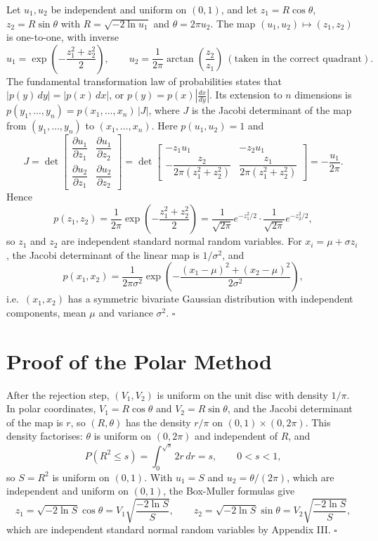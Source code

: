 \documentclass[12pt,a4paper]{article}
\begin{document}
{Let $u_1, u_2$ be independent and uniform on $(0,1)$, and let $z_1 = R\cos\theta$, $z_2 = R\sin\theta$ with $R = \sqrt{-2\ln u_1}$ and $\theta = 2\pi u_2$. The map $(u_1, u_2) \mapsto (z_1, z_2)$ is one-to-one, with inverse
\[
u_1 = \exp\left(-\frac{z_1^2 + z_2^2}{2}\right), \qquad u_2 = \frac{1}{2\pi}\arctan\left(\frac{z_2}{z_1}\right) \ (\text{taken in the correct quadrant}).
\]
The fundamental transformation law of probabilities states that $|p(y)\,dy| = |p(x)\,dx|$, or $p(y) = p(x)\left|\frac{dx}{dy}\right|$. Its extension to $n$ dimensions is $p(y_1, \dots, y_n) = p(x_1, \dots, x_n)\,|J|$, where $J$ is the Jacobi determinant of the map from $(y_1, \dots, y_n)$ to $(x_1, \dots, x_n)$. Here $p(u_1, u_2) = 1$ and
\[
J = \det\begin{bmatrix} \dfrac{\partial u_1}{\partial z_1} & \dfrac{\partial u_1}{\partial z_2} \\[8pt] \dfrac{\partial u_2}{\partial z_1} & \dfrac{\partial u_2}{\partial z_2}\end{bmatrix}
= \det\begin{bmatrix} -z_1 u_1 & -z_2 u_1 \\[4pt] -\dfrac{z_2}{2\pi(z_1^2 + z_2^2)} & \dfrac{z_1}{2\pi(z_1^2 + z_2^2)}\end{bmatrix}
= -\frac{u_1}{2\pi}.
\]
Hence
\[
p(z_1, z_2) = \frac{1}{2\pi}\exp\left(-\frac{z_1^2 + z_2^2}{2}\right) = \frac{1}{\sqrt{2\pi}}e^{-z_1^2/2} \cdot \frac{1}{\sqrt{2\pi}}e^{-z_2^2/2},
\]
so $z_1$ and $z_2$ are independent standard normal random variables. For $x_i = \mu + \sigma z_i$, the Jacobi determinant of the linear map is $1/\sigma^2$, and
\[
p(x_1, x_2) = \frac{1}{2\pi\sigma^2}\exp\left(-\frac{(x_1-\mu)^2 + (x_2-\mu)^2}{2\sigma^2}\right),
\]
i.e.\ $(x_1, x_2)$ has a symmetric bivariate Gaussian distribution with independent components, mean $\mu$ and variance $\sigma^2$. \hfill$\square$

\section{Proof of the Polar Method}

After the rejection step, $(V_1, V_2)$ is uniform on the unit disc with density $1/\pi$. In polar coordinates, $V_1 = R\cos\theta$ and $V_2 = R\sin\theta$, and the Jacobi determinant of the map is $r$, so $(R, \theta)$ has the density $r/\pi$ on $(0,1) \times (0, 2\pi)$. This density factorises: $\theta$ is uniform on $(0, 2\pi)$ and independent of $R$, and
\[
P(R^2 \le s) = \int_0^{\sqrt{s}} 2r\,dr = s, \qquad 0 < s < 1,
\]
so $S = R^2$ is uniform on $(0,1)$. With $u_1 = S$ and $u_2 = \theta/(2\pi)$, which are independent and uniform on $(0,1)$, the Box-Muller formulas give
\[
z_1 = \sqrt{-2\ln S}\cos\theta = V_1\sqrt{\frac{-2\ln S}{S}}, \qquad z_2 = \sqrt{-2\ln S}\sin\theta = V_2\sqrt{\frac{-2\ln S}{S}},
\]
which are independent standard normal random variables by Appendix III. \hfill$\square$
}
\end{document}
